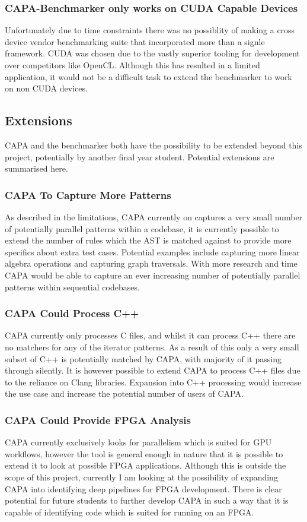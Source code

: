 \subsubsection{CAPA-Benchmarker only works on CUDA Capable Devices}
Unfortunately due to time constraints there was no possiblity of making a cross device vendor
benchmarking suite that incorporated more than a signle framework. CUDA was chosen due to the vastly
superior tooling for development over competitors like OpenCL. Although this has resulted in a
limited application, it would not be a difficult task to extend the benchmarker to work on non CUDA
devices.


\pagebreak

\subsection{Extensions}
CAPA and the benchmarker both have the possibility to be extended beyond this project, potentially
by another final year student. Potential extensions are summarised here.

\subsubsection{CAPA To Capture More Patterns}
As described in the limitations, CAPA currently on captures a very small number of potentially
parallel patterns within a codebase, it is currently possible to extend the number of rules which
the AST is matched against to provide more specifics about extra test cases. Potential examples
include capturing more linear algebra operations and capturing graph traversals. With more research
and time CAPA would be able to capture an ever increasing number of potentially parallel patterns
within sequential codebases.

\subsubsection{CAPA Could Process C++}
CAPA currently only processes C files, and whilst it can process C++ there are no matchers for any
of the iterator patterns. As a result of this only a very small subset of C++ is potentially matched
by CAPA, with majority of it passing through silently. It is however possible to extend CAPA to
process C++ files due to the reliance on Clang libraries. Expansion into C++ processing would
increase the use case and increase the potential number of users of CAPA.

\subsubsection{CAPA Could Provide FPGA Analysis}
CAPA currently exclusively looks for parallelism which is suited for GPU workflows, however the tool
is general enough in nature that it is possible to extend it to look at possible FPGA applications.
Although this is outside the scope of this project, currently I am looking at the possibility of
expanding CAPA into identifying deep pipelines for FPGA development. There is clear potential for
future students to further develop CAPA in such a way that it is capable of identifying code which
is suited for running on an FPGA.

